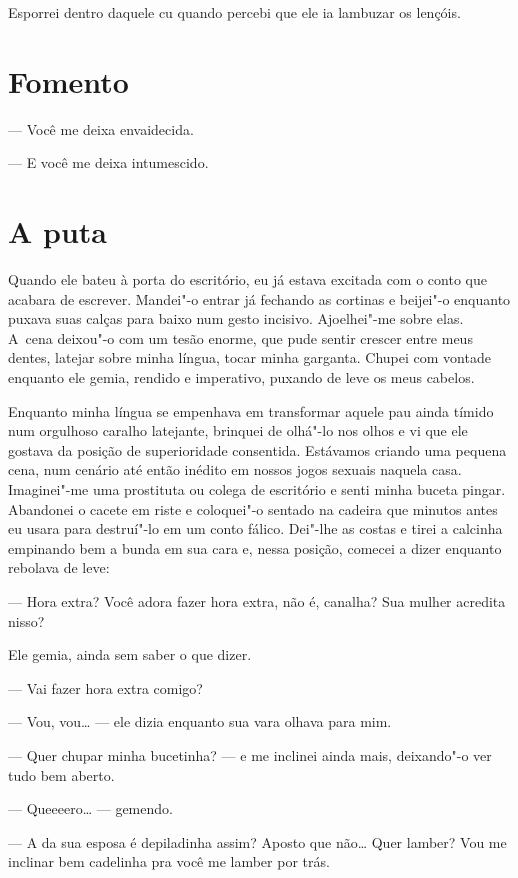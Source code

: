 Esporrei dentro daquele cu quando percebi que ele ia lambuzar os
lençóis.

\chapter{Fomento}

\mbox{}\indent{}--- Você me deixa envaidecida.

--- E você me deixa intumescido.

\chapter{A puta}

Quando ele bateu à porta do escritório, eu já estava excitada com o
conto que acabara de escrever. Mandei"-o entrar já fechando as cortinas e
beijei"-o enquanto puxava suas calças para baixo num gesto incisivo.
Ajoelhei"-me sobre elas. A~cena deixou"-o com um tesão enorme, que pude
sentir crescer entre meus dentes, latejar sobre minha língua, tocar
minha garganta. Chupei com vontade enquanto ele gemia, rendido e
imperativo, puxando de leve os meus cabelos.

Enquanto minha língua se empenhava em transformar aquele pau ainda
tímido num orgulhoso caralho latejante, brinquei de olhá"-lo nos olhos e
vi que ele gostava da posição de superioridade consentida. Estávamos
criando uma pequena cena, num cenário até então inédito em nossos jogos
sexuais naquela casa. Imaginei"-me uma prostituta ou colega de escritório
e senti minha buceta pingar. Abandonei o cacete em riste e coloquei"-o
sentado na cadeira que minutos antes eu usara para destruí"-lo em um
conto fálico. Dei"-lhe as costas e tirei a calcinha empinando bem a bunda
em sua cara e, nessa posição, comecei a dizer enquanto rebolava de leve:

--- Hora extra? Você adora fazer hora extra, não é, canalha? Sua mulher
acredita nisso?

Ele gemia, ainda sem saber o que dizer.

--- Vai fazer hora extra comigo?

--- Vou, vou… --- ele dizia enquanto sua vara olhava para mim.

--- Quer chupar minha bucetinha? --- e me inclinei ainda mais,
deixando"-o ver tudo bem aberto.

--- Queeeero… --- gemendo.

--- A da sua esposa é depiladinha assim? Aposto que não… Quer
lamber? Vou me inclinar bem cadelinha pra você me lamber por trás.


